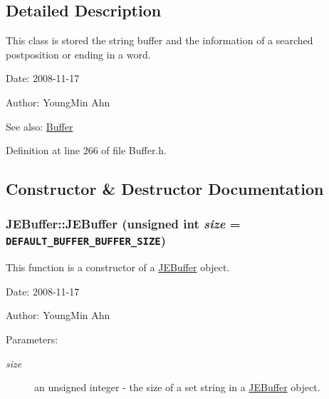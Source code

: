 \subsection{Detailed Description}
This class is stored the string buffer and the information of a searched postposition or ending in a word. 

\begin{Desc}
\item[Date:]2008-11-17 \end{Desc}
\begin{Desc}
\item[Author:]YoungMin Ahn \end{Desc}
\begin{Desc}
\item[See also:]\hyperlink{classkmaOrange_1_1Buffer}{Buffer} \end{Desc}


Definition at line 266 of file Buffer.h.

\subsection{Constructor \& Destructor Documentation}
\hypertarget{classkmaOrange_1_1JEBuffer_3778d966cc4cf4e93b22e0e17ca84e92}{
\subsubsection[{JEBuffer}]{\setlength{\rightskip}{0pt plus 5cm}JEBuffer::JEBuffer (unsigned int {\em size} = {\tt DEFAULT\_\-BUFFER\_\-BUFFER\_\-SIZE})}}
\label{classkmaOrange_1_1JEBuffer_3778d966cc4cf4e93b22e0e17ca84e92}


This function is a constructor of a \hyperlink{classkmaOrange_1_1JEBuffer}{JEBuffer} object. 

\begin{Desc}
\item[Date:]2008-11-17 \end{Desc}
\begin{Desc}
\item[Author:]YoungMin Ahn \end{Desc}
\begin{Desc}
\item[Parameters:]
\begin{description}
\item[{\em size}]an unsigned integer - the size of a set string in a \hyperlink{classkmaOrange_1_1JEBuffer}{JEBuffer} object. \end{description}
\end{Desc}


